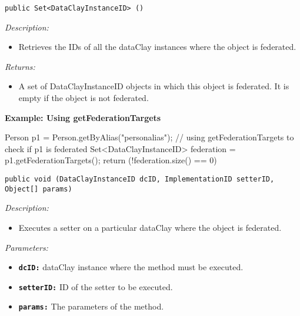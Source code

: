 
\begin{dBox}
\texttt{public Set<DataClayInstanceID> ()}
\LINE

{\it Description:}

\begin{itemize}
 \item Retrieves the IDs of all the dataClay instances where the object is federated. 
\end{itemize}

{\it Returns:}

\begin{itemize}
 \item A set of DataClayInstanceID objects in which this object is federated. 
 It is empty if the object is not federated.
\end{itemize}

\end{dBox}

\begin{tBox}
\textcolor{basecolor} {\bf Example: Using getFederationTargets}
\begin{java}
Person p1 = Person.getByAlias("personalias");
// using getFederationTargets to check if p1 is federated
Set<DataClayInstanceID> federation = p1.getFederationTargets();
return (!federation.size() == 0)
\end{java}
\end{tBox}


\begin{dBox}
\texttt{public void (DataClayInstanceID dcID, \newline ImplementationID setterID, Object[] params)} 
\LINE

{\it Description:}

\begin{itemize}
  \item Executes a setter on a particular dataClay where the object is federated.
\end{itemize}

{\it Parameters:}

\begin{itemize}
  \item \texttt{\bfseries dcID:} dataClay instance where the method must be executed.
  \item \texttt{\bfseries setterID:} ID of the setter to be executed.
  \item \texttt{\bfseries params:} The parameters of the method.
\end{itemize}
 
\end{dBox}

